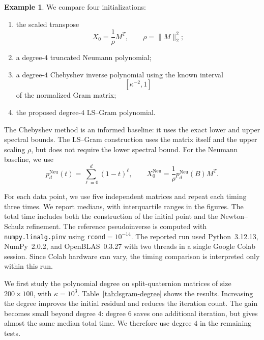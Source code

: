 \documentclass[12pt,a4paper]{article}
\theoremstyle{plain}
\theoremstyle{definition}
\newtheorem{example}[theorem]{Example}
\theoremstyle{remark}
\begin{document}
\begin{example}
We compare four initializations:
\begin{enumerate}
\item the scaled transpose
\[
    X_0=\frac{1}{\rho}M^T, \qquad \rho=\|M\|_2^2;
\]
\item a degree-\(4\) truncated Neumann polynomial;
\item a degree-\(4\) Chebyshev inverse polynomial using the known interval
\[
    [\kappa^{-2},1]
\]
of the normalized Gram matrix;
\item the proposed degree-\(4\) LS--Gram polynomial.
\end{enumerate}
The Chebyshev method is an informed baseline: it uses the exact lower and upper spectral bounds. The LS--Gram construction uses the matrix itself and the upper scaling \(\rho\), but does not require the lower spectral bound.
For the Neumann baseline, we use
\[
p_d^{\mathrm{Neu}}(t)
=
\sum_{\ell=0}^{d}(1-t)^\ell,
\qquad
X_0^{\mathrm{Neu}}
=
\frac{1}{\rho}p_d^{\mathrm{Neu}}(B)M^T.
\]

For each data point, we use five independent matrices and repeat each timing three times. We report medians, with interquartile ranges in the figures. The total time includes both the construction of the initial point and the Newton--Schulz refinement. The reference pseudoinverse is computed with \texttt{numpy.linalg.pinv} using \texttt{rcond}$=10^{-14}$. The reported run used Python~3.12.13, NumPy~2.0.2, and OpenBLAS~0.3.27 with two threads in a single Google Colab session. Since Colab hardware can vary, the timing comparison is interpreted only within this run.

We first study the polynomial degree on split-quaternion matrices of size \(200\times100\), with \(\kappa=10^3\). Table~\ref{tab:lsgram-degree} shows the results. Increasing the degree improves the initial residual and reduces the iteration count. The gain becomes small beyond degree \(4\): degree \(6\) saves one additional iteration, but gives almost the same median total time. We therefore use degree \(4\) in the remaining tests.


\end{example}
\end{document}
